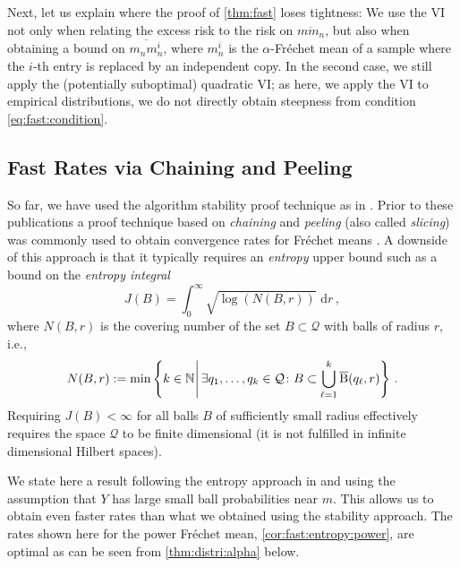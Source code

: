 \documentclass{article}
\newcommand*{\mc}[1]{\mathcal{#1}}
\newcommand{\N}{\mathbb{N}}
\newcommand{\ball}{\mathrm{B}}
\newcommand{\lcb}{\left\lbrace} %
\newcommand{\rcb}{\right\rbrace} %
\newcommand{\cb}[1]{\lcb #1 \rcb} %
\newcommand{\sizedMid}[2]{#1 \, \kern-\nulldelimiterspace\mathopen{}\left| \vphantom{#1}\,#2\right.\mathclose{}\kern-\nulldelimiterspace}
\newcommand{\setByEle}[2]{\cb{\sizedMid{#1}{#2}}}
\newcommand{\eqcm}{\,,} %
\newcommand{\eqfs}{\,.}
\newcommand{\dl}{\mathrm{d}} %
\newcommand{\ol}[2]{\overline{#1#2}}
\newcommand{\ballclosed}{\overline{\ball}}
\begin{document}
Next, let us explain where the proof of \cref{thm:fast} loses tightness: We use the VI not only when relating the excess risk to the risk on $\ol m{m_n}$, but also when obtaining a bound on $\ol{m_n}{m_n^i}$, where $m_n^i$ is the $\alpha$-Fr\'echet mean of a sample where the $i$-th entry is replaced by an independent copy. In the second case, we still apply the (potentially suboptimal) quadratic VI; as here, we apply the VI to empirical distributions, we do not directly obtain steepness from condition \eqref{eq:fast:condition}. 
% 
%
%
\subsection{Fast Rates via Chaining and Peeling}
%
So far, we have used the algorithm stability proof technique as in \cite{Escande2024,brunel2025}. Prior to these publications a proof technique based on \textit{chaining} \cite{vaart96, talagrand21} and \textit{peeling} (also called \textit{slicing}) \cite{geer00} was commonly used to obtain convergence rates for Fr\'echet means \cite{Petersen2019,schoetz19,Ahidar2020}. A downside of this approach is that it typically requires an \textit{entropy} upper bound such as a bound on the \textit{entropy integral}
\begin{equation}\label{eq:entropy:inte}
    J(B) = \int_0^{\infty} \!\!\sqrt{\log(N(B,r))} \,\,\dl r
    \eqcm
\end{equation}
where $N(B,r)$ is the covering number of the set $B \subset \mc Q$ with balls of radius $r$, i.e., 
\begin{equation}
    N(B,r) := \min\setByEle{k \in \N}{\exists q_1,\dots, q_k \in \mc Q\colon B \subset \bigcup_{\ell=1}^k \ballclosed(q_\ell, r)}
    \eqfs
\end{equation}
Requiring $J(B) < \infty$ for all balls $B$ of sufficiently small radius effectively requires the space $\mc Q$ to be finite dimensional (it is not fulfilled in infinite dimensional Hilbert spaces). 

We state here a result following the entropy approach in \cite{schoetz19} and using the assumption that $Y$ has large small ball probabilities near $m$. This allows us to obtain even faster rates than what we obtained using the stability approach. The rates shown here for the power Fr\'echet mean, \cref{cor:fast:entropy:power}, are optimal as can be seen from \cref{thm:distri:alpha} below. 
\end{document}
